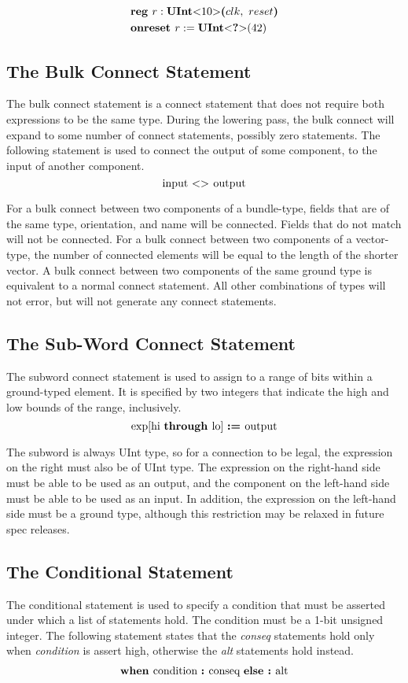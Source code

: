 \documentclass[12pt]{article}
\begin{document}
\[
\begin{aligned}
& \kw{reg} r : \kws{UInt}\kws{$<$} 10 \kws{$>$} \kws{(} clk, \ reset \kws{)}\\
& \kw{onreset} r := \kws{UInt}\kws{$<$} \kws{?} \kws{$>$}(42)
\end{aligned}
\]

\subsection{The Bulk Connect Statement}
The bulk connect statement is a connect statement that does not require both expressions to be the same type. 
During the lowering pass, the bulk connect will expand to some number of connect statements, possibly zero statements.
The following statement is used to connect the output of some component, to the input of another component. 
\[
\text{input } \text{\bf $<>$\ } \text{output} 
\]

For a bulk connect between two components of a bundle-type, fields that are of the same type, orientation, and name will be connected.
Fields that do not match will not be connected.
For a bulk connect between two components of a vector-type, the number of connected elements will be equal to the length of the shorter vector.
A bulk connect between two components of the same ground type is equivalent to a normal connect statement.
All other combinations of types will not error, but will not generate any connect statements.

\subsection{The Sub-Word Connect Statement}
The subword connect statement is used to assign to a range of bits within a ground-typed element. It is specified by two integers that indicate the high and low bounds of the range, inclusively.
\[
\text{exp}[\text{hi } \kw{through} \text{lo}] \ \kw{:=} \text{output} 
\]

The subword is always UInt type, so for a connection to be legal, the expression on the right must also be of UInt type.
The expression on the right-hand side must be able to be used as an output, and the component on the left-hand side must be able to be used as an input.
In addition, the expression on the left-hand side must be a ground type, although this restriction may be relaxed in future spec releases.

\subsection{The Conditional Statement}
The conditional statement is used to specify a condition that must be asserted under which a list of statements hold.
The condition must be a 1-bit unsigned integer.
The following statement states that the {\em conseq} statements hold only when {\em condition} is assert high, otherwise the {\em alt} statements hold instead.
\[
\begin{aligned}
\text{\bf when\ } \text{condition } \text{\bf :\ } \text{conseq } \text{\bf else :\ } \text{alt}
\end{aligned}
\]
\end{document}
